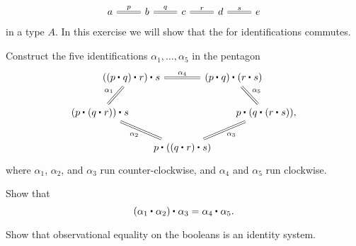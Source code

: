 \begin{exercises}
\begin{equation*}
    \begin{tikzcd}
      a \arrow[r,equals,"p"] & b \arrow[r,equals,"q"] & c \arrow[r,equals,"r"] & d \arrow[r,equals,"s"] & e
    \end{tikzcd}
  \end{equation*}
  in a type $A$. In this exercise we will show that the  for identifications commutes.
  \begin{subexenum}
  \item Construct the five identifications $\alpha_1,\ldots,\alpha_5$ in the pentagon
    \begin{equation*}
      \begin{tikzcd}[column sep=-1.5em]
        &[-2em] \ct{(\ct{(\ct{p}{q})}{r})}{s} \arrow[rr,equals,"\alpha_4"] \arrow[dl,equals,swap,"\alpha_1"] & & \ct{(\ct{p}{q})}{(\ct{r}{s})} \arrow[dr,equals,"\alpha_5"] &[-2em] \\
        \ct{(\ct{p}{(\ct{q}{r})})}{s} \arrow[drr,equals,swap,"\alpha_2"] & & & & \ct{p}{(\ct{q}{(\ct{r}{s})})}, \\
        & & \ct{p}{(\ct{(\ct{q}{r})}{s})} \arrow[urr,equals,swap,"\alpha_3"]
      \end{tikzcd}
    \end{equation*}
    where $\alpha_1$, $\alpha_2$, and $\alpha_3$ run counter-clockwise, and $\alpha_4$ and $\alpha_5$ run clockwise.
  \item Show that
    \begin{equation*}
      \ct{(\ct{\alpha_1}{\alpha_2})}{\alpha_3} = \ct{\alpha_4}{\alpha_5}.
    \end{equation*}
  \end{subexenum}
\item Show that observational equality on the booleans is an identity system.
\end{exercises}

